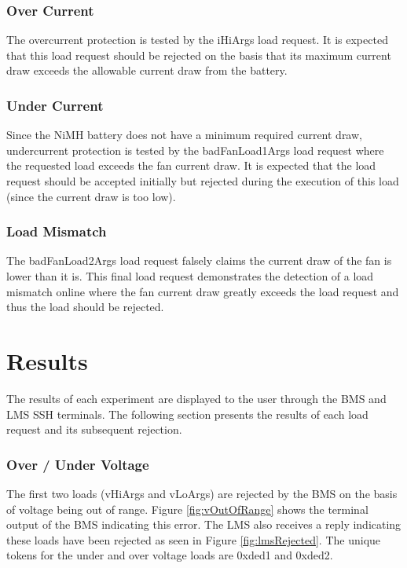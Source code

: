 \documentclass[11pt,conference,draftcls,onecolumn]{IEEEtran}
\begin{document}
\subsubsection{Over Current}
The overcurrent protection is tested by the iHiArgs load request.
It is expected that this load request should be rejected on the basis that its maximum current draw exceeds the allowable current draw from the battery.

\subsubsection{Under Current}
Since the NiMH battery does not have a minimum required current draw, undercurrent protection is tested by the badFanLoad1Args load request where the requested load exceeds the fan current draw.
It is expected that the load request should be accepted initially but rejected during the execution of this load (since the current draw is too low).

\subsubsection{Load Mismatch}
The badFanLoad2Args load request falsely claims the current draw of the fan is lower than it is.
This final load request demonstrates the detection of a load mismatch online where the fan current draw greatly exceeds the load request and thus the load should be rejected.

\section{Results}\label{sec:results}
The results of each experiment are displayed to the user through the BMS and LMS SSH terminals.
The following section presents the results of each load request and its subsequent rejection.

\subsubsection{Over / Under Voltage}
The first two loads (vHiArgs and vLoArgs) are rejected by the BMS on the basis of voltage being out of range.
Figure \ref{fig:vOutOfRange} shows the terminal output of the BMS indicating this error.
The LMS also receives a reply indicating these loads have been rejected as seen in Figure \ref{fig:lmsRejected}.
The unique tokens for the under and over voltage loads are 0xded1 and 0xded2.
\end{document}
